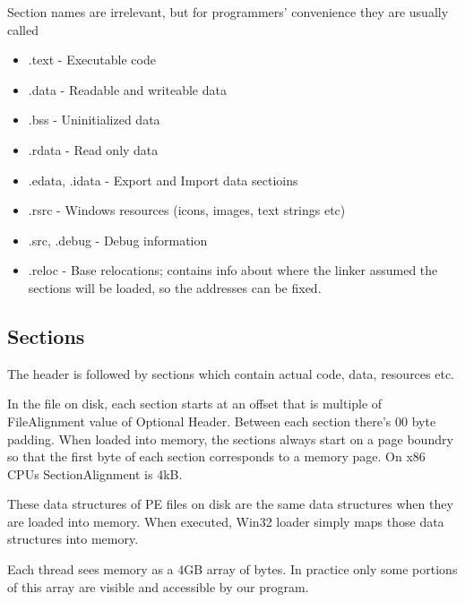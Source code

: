 \documentclass[a4paper,12pt]{article}
\begin{document}
Section names are irrelevant, but for programmers'
convenience they are usually called

\begin{itemize}
\item .text - Executable code
\item .data - Readable and writeable data
\item .bss - Uninitialized data
\item .rdata - Read only data
\item .edata, .idata - Export and Import data sectioins
\item .rsrc - Windows resources (icons, images, text strings etc)
\item .src, .debug - Debug information
\item .reloc - Base relocations; contains info about where the linker
    assumed the sections will be loaded, so the addresses can be fixed.
\end{itemize}

\subsection{Sections}
The header is followed by sections which contain actual code, data, resources
etc.

In the file on disk, each section starts at an offset that is multiple of
FileAlignment value of Optional Header. Between each section there's 00 byte
padding. When loaded into memory, the sections always start on a page boundry
so that the first byte of each section corresponds to a memory page. On x86
CPUs SectionAlignment is 4kB.

These data structures of PE files on disk are the same data structures when
they are loaded into memory. When executed, Win32 loader simply maps those
data structures into memory.

Each thread sees memory as a 4GB array of bytes. In practice only some portions
of this array are visible and accessible by our program.
\end{document}
